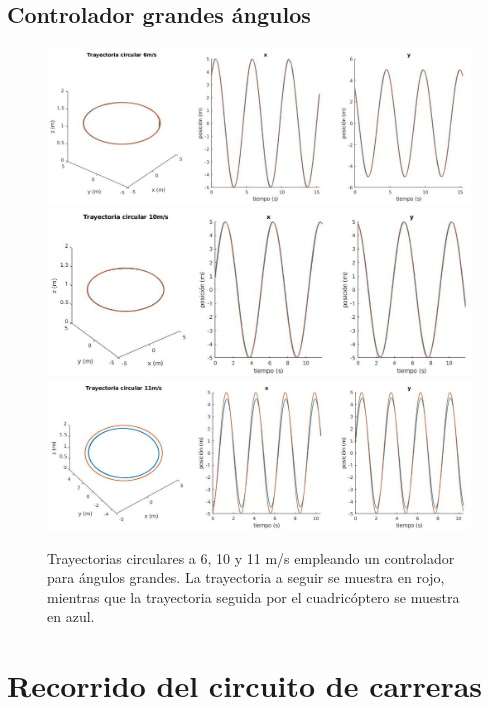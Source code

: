 \subsection{Controlador grandes  ángulos}

\begin{figure}[htb!]
	\centering
	\includegraphics[width=\textwidth]{imagenes/fast_circle6ms}
	\includegraphics[width=\textwidth]{imagenes/fast_circle10ms}
	\includegraphics[width=\textwidth]{imagenes/fast_circle11ms}
	\caption{Trayectorias circulares a 6, 10 y 11 m/s empleando un controlador para ángulos grandes. La trayectoria a seguir se muestra en rojo, mientras que la trayectoria seguida por el cuadricóptero se muestra en azul.}
	\label{circle:fast}
\end{figure}
\newpage

\section{Recorrido del circuito de carreras}

